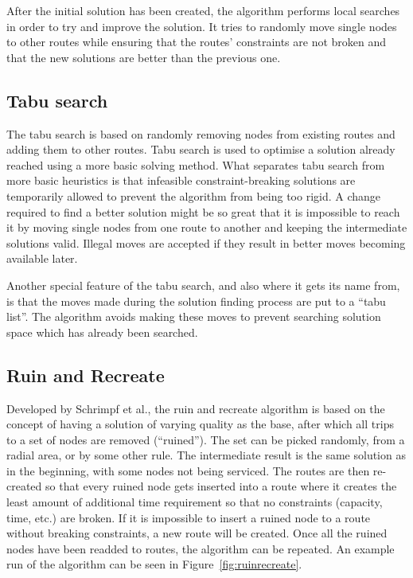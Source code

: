 After the initial solution has been created, the algorithm performs local searches in order to try and improve the solution. It tries to randomly move single nodes to other routes while ensuring that the routes' constraints are not broken and that the new solutions are better than the previous one. \cite{kontoravdis1995grasp}


\subsection{Tabu search}

The tabu search is based on randomly removing nodes from existing routes and adding them to other routes. Tabu search is used to optimise a solution already reached using a more basic solving method. What separates tabu search from more basic heuristics is that infeasible constraint-breaking solutions are temporarily allowed to prevent the algorithm from being too rigid. A change required to find a better solution might be so great that it is impossible to reach it by moving single nodes from one route to another and keeping the intermediate solutions valid. Illegal moves are accepted if they result in better moves becoming available later. \cite{gendreau1994tabu}

Another special feature of the tabu search, and also where it gets its name from, is that the moves made during the solution finding process are put to a ``tabu list''. The algorithm avoids making these moves to prevent searching solution space which has already been searched. \cite{gendreau1994tabu}
 

\subsection {Ruin and Recreate}
\label{subsection:ruinandrecreate} 

Developed by Schrimpf et al., the ruin and recreate algorithm is based on the concept of having a solution of varying quality as the base, after which all trips to a set of nodes are removed (``ruined''). The set can be picked randomly, from a radial area, or by some other rule. The intermediate result is the same solution as in the beginning, with some nodes not being serviced. The routes are then re-created so that every ruined node gets inserted into a route where it creates the least amount of additional time requirement so that no constraints (capacity, time, etc.) are broken. If it is impossible to insert a ruined node to a route without breaking constraints, a new route will be created. Once all the ruined nodes have been readded to routes, the algorithm can be repeated. An example run of the algorithm can be seen in Figure~\ref{fig:ruinrecreate}. \cite{schrimpf2000record} 


